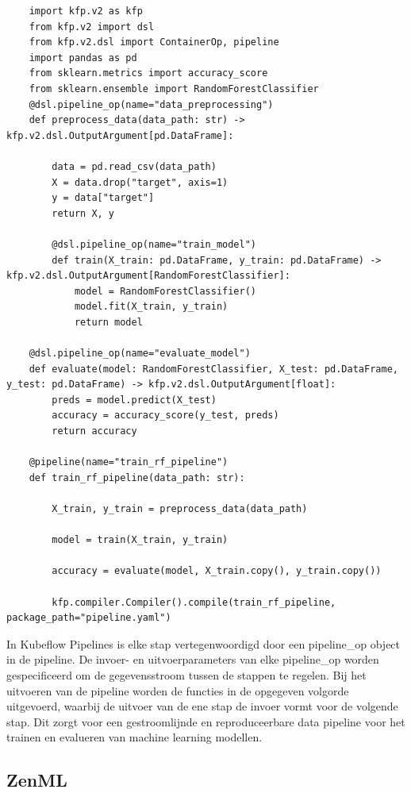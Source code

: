 \begin{verbatim}
    import kfp.v2 as kfp
    from kfp.v2 import dsl
    from kfp.v2.dsl import ContainerOp, pipeline
    import pandas as pd
    from sklearn.metrics import accuracy_score
    from sklearn.ensemble import RandomForestClassifier
    @dsl.pipeline_op(name="data_preprocessing")
    def preprocess_data(data_path: str) -> kfp.v2.dsl.OutputArgument[pd.DataFrame]:

        data = pd.read_csv(data_path)
        X = data.drop("target", axis=1)
        y = data["target"]
        return X, y

        @dsl.pipeline_op(name="train_model")
        def train(X_train: pd.DataFrame, y_train: pd.DataFrame) -> kfp.v2.dsl.OutputArgument[RandomForestClassifier]:
            model = RandomForestClassifier()
            model.fit(X_train, y_train)
            return model

    @dsl.pipeline_op(name="evaluate_model")
    def evaluate(model: RandomForestClassifier, X_test: pd.DataFrame, y_test: pd.DataFrame) -> kfp.v2.dsl.OutputArgument[float]:
        preds = model.predict(X_test)
        accuracy = accuracy_score(y_test, preds)
        return accuracy

    @pipeline(name="train_rf_pipeline")
    def train_rf_pipeline(data_path: str):

        X_train, y_train = preprocess_data(data_path)

        model = train(X_train, y_train)

        accuracy = evaluate(model, X_train.copy(), y_train.copy())

        kfp.compiler.Compiler().compile(train_rf_pipeline, package_path="pipeline.yaml")
\end{verbatim}
In Kubeflow Pipelines is elke stap vertegenwoordigd door een pipeline_op object in de pipeline. De invoer- en uitvoerparameters van elke pipeline_op worden gespecificeerd om de gegevensstroom tussen de stappen te regelen. Bij het uitvoeren van de pipeline worden de functies in de opgegeven volgorde uitgevoerd, waarbij de uitvoer van de ene stap de invoer vormt voor de volgende stap. Dit zorgt voor een gestroomlijnde en reproduceerbare data pipeline voor het trainen en evalueren van machine learning modellen.
\subsection{ZenML}

